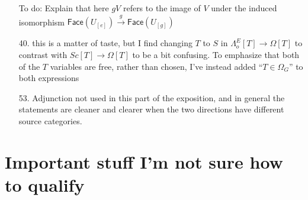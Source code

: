 \documentclass{article}
\begin{document}
\begin{itemize}
{\color{red} To do:} Explain that here $gV$ refers to the image of $V$ under the induced isomorphism 
$\mathsf{Face}(U_{[e]}) \xrightarrow{g} \mathsf{Face}(U_{[g]})$

\item[40.] this is a matter of taste, but I find changing $T$ to $S$ in $\Lambda^E_o[T] \to \Omega[T]$ to contrast with $Sc[T] \to \Omega[T]$ to be a bit confusing. To emphasize that both of the $T$ variables are free, rather than chosen, I've instead added ``$T\in \Omega_G$'' to both expressions
\item[53.] Adjunction not used in this part of the exposition, and in general the statements are cleaner and clearer when the two directions have different source categories.
\end{itemize}



\section{Important stuff I'm not sure how to qualify}
\end{document}
